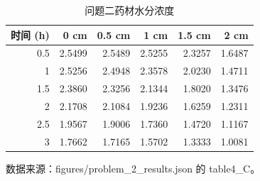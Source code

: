 \begin{table}[H]
  \centering
  \caption{问题二药材水分浓度}
  \label{tab:q2_C}
  \begin{tabular}{rrrrrr}
    \toprule
    时间 (h) & 0 cm & 0.5 cm & 1 cm & 1.5 cm & 2 cm \\
    \midrule
    0.5 & 2.5499 & 2.5489 & 2.5255 & 2.3257 & 1.6487 \\
    1 & 2.5256 & 2.4948 & 2.3578 & 2.0230 & 1.4711 \\
    1.5 & 2.3860 & 2.3256 & 2.1344 & 1.8020 & 1.3476 \\
    2 & 2.1708 & 2.1084 & 1.9236 & 1.6259 & 1.2311 \\
    2.5 & 1.9567 & 1.9006 & 1.7360 & 1.4720 & 1.1167 \\
    3 & 1.7662 & 1.7165 & 1.5702 & 1.3333 & 1.0081 \\
    \bottomrule
  \end{tabular}
  \par\vspace{2pt}\footnotesize 数据来源：figures/problem\_2\_results.json 的 table4\_C。
\end{table}
